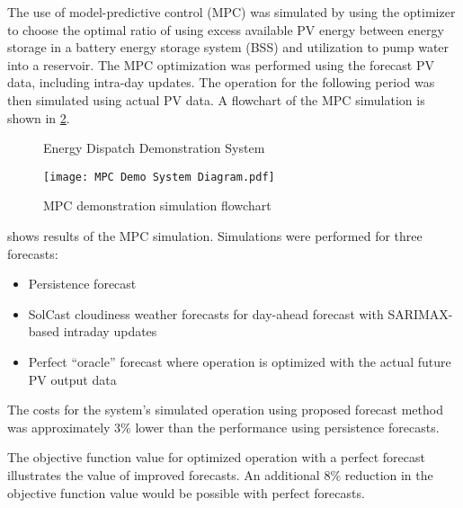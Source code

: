 The use of model-predictive control (MPC) was simulated by using the optimizer to choose the optimal ratio of using excess available PV energy between energy storage in a battery energy storage system (BSS) and utilization to pump water into a reservoir.
The MPC optimization was performed using the forecast PV data, including intra-day updates.
The operation for the following period was then simulated using actual PV data.
A flowchart of the MPC simulation is shown in \cref{fig:mpc-simulation-flowchart}.

\begin{figure}[thb]
	\centering
	\fontsize{6pt}{7pt}\selectfont
	\def\svgwidth{0.8\columnwidth}
	
	\caption{Energy Dispatch Demonstration System}
	\label{fig:demo-system}
\end{figure}

\begin{figure}[thb]
	\centering
	\texttt{[image: MPC Demo System Diagram.pdf]}
	\caption{MPC demonstration simulation flowchart}
	\label{fig:mpc-simulation-flowchart}
\end{figure}

 shows results of the MPC simulation. Simulations were performed for three forecasts:

\begin{itemize}
\item Persistence forecast
\item SolCast cloudiness weather forecasts for day-ahead forecast with SARIMAX-based intraday updates
\item Perfect ``oracle'' forecast where operation is optimized with the actual future PV output data
\end{itemize}

The costs for the system's simulated operation using proposed forecast method was approximately
3\% lower than the performance using persistence forecasts.

The objective function value for optimized operation with a perfect forecast illustrates the value of improved forecasts.
An additional 8\% reduction in the objective function value would be possible with perfect forecasts.

